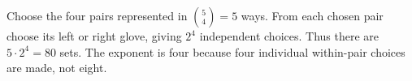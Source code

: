 Choose the four pairs represented in $\binom54=5$ ways. From each chosen pair choose its left or right glove, giving $2^4$ independent choices. Thus there are $5\cdot2^4=\boxed{80}$ sets. The exponent is four because four individual within-pair choices are made, not eight.
